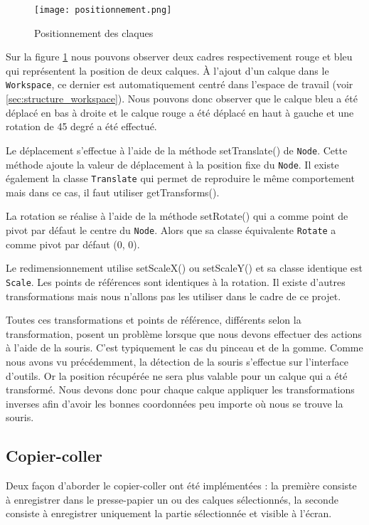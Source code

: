 \begin{figure}[!ht]
    \caption{Positionnement des claques}
    \centering
    \texttt{[image: positionnement.png]}
    \label{fig:calque_positionnement}
\end{figure}

Sur la figure \ref{fig:calque_positionnement} nous pouvons observer deux cadres respectivement rouge et bleu qui représentent la position de deux calques. À l'ajout d'un calque dans le \texttt{Workspace}, ce dernier est automatiquement centré dans l'espace de travail (voir \ref{sec:structure_workspace}). Nous pouvons donc observer que le calque bleu a été déplacé en bas à droite et le calque rouge a été déplacé en haut à gauche et une rotation de 45 degré a été effectué.

Le déplacement s'effectue à l'aide de la méthode setTranslate() de \texttt{Node}. Cette méthode ajoute la valeur de déplacement à la position fixe du \texttt{Node}. Il existe également la classe \texttt{Translate} qui permet de reproduire le même comportement mais dans ce cas, il faut utiliser getTransforms().

La rotation se réalise à l'aide de la méthode setRotate() qui a comme point de pivot par défaut le centre du \texttt{Node}. Alors que sa classe équivalente \texttt{Rotate} a comme pivot par défaut (0, 0).

Le redimensionnement utilise setScaleX() ou setScaleY() et sa classe identique est \texttt{Scale}. Les points de références sont identiques à la rotation. Il existe d'autres transformations mais nous n'allons pas les utiliser dans le cadre de ce projet.

Toutes ces transformations et points de référence, différents selon la transformation, posent un problème lorsque que nous devons effectuer des actions à l'aide de la souris. C'est typiquement le cas du pinceau et de la gomme. Comme nous avons vu précédemment, la détection de la souris s'effectue sur l'interface d'outils. Or la position récupérée ne sera plus valable pour un calque qui a été transformé. Nous devons donc pour chaque calque appliquer les transformations inverses afin d'avoir les bonnes coordonnées peu importe où nous se trouve la souris.

\subsection{Copier-coller}
\label{sec:copiercoller}
Deux façon d'aborder le copier-coller ont été implémentées : la première consiste à enregistrer dans le presse-papier un ou des calques sélectionnés, la seconde consiste à enregistrer uniquement la partie sélectionnée et visible à l'écran.

